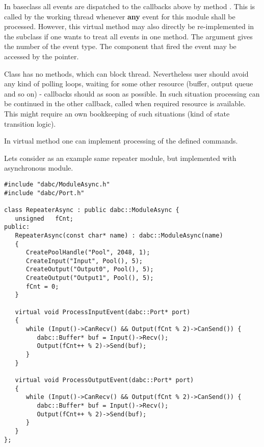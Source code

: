 \begin{compactenum}
\item   In baseclass  all events are dispatched to the callbacks above by method 
. 
This is called by the working thread
whenever {\bf any} event for this module shall be processed.
However, this virtual method  
may also directly be re-implemented in the  subclass
if one wants to treat all events in one method. 
The  argument gives the number of the event type. 
The component that fired the event may be accessed 
by the  pointer. 
      
\item  Class  has no methods, which can block thread.
Nevertheless user should avoid any kind of polling loops, waiting for some
other resource (buffer, output queue and so on) - callbacks should 
as soon as possible. In such situation processing can be continued in 
the other callback, called when required resource is available. 
This might require an own bookkeeping of such situations (kind of state transition logic). 

\item  In virtual  method one can implement 
      processing of the defined commands.

\end{compactenum}

Lets consider as an example same repeater module, but implemented with asynchronous module.
   
\begin{small}
\begin{verbatim}
#include "dabc/ModuleAsync.h"
#include "dabc/Port.h"

class RepeaterAsync : public dabc::ModuleAsync {
   unsigned   fCnt;
public:
   RepeaterAsync(const char* name) : dabc::ModuleAsync(name)
   {
      CreatePoolHandle("Pool", 2048, 1);
      CreateInput("Input", Pool(), 5);
      CreateOutput("Output0", Pool(), 5);
      CreateOutput("Output1", Pool(), 5);
      fCnt = 0;
   }
    
   virtual void ProcessInputEvent(dabc::Port* port) 
   {
      while (Input()->CanRecv() && Output(fCnt % 2)->CanSend()) {
         dabc::Buffer* buf = Input()->Recv();
         Output(fCnt++ % 2)->Send(buf);
      }
   }

   virtual void ProcessOutputEvent(dabc::Port* port) 
   {
      while (Input()->CanRecv() && Output(fCnt % 2)->CanSend()) {
         dabc::Buffer* buf = Input()->Recv();
         Output(fCnt++ % 2)->Send(buf);
      }
   }
};
\end{verbatim}
\end{small}

